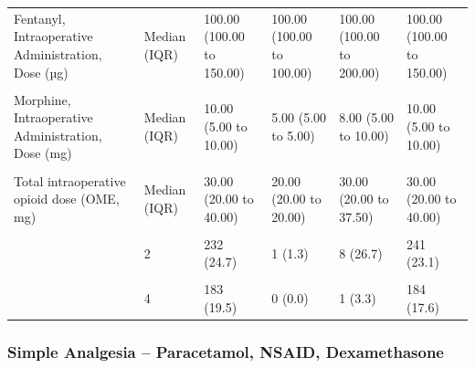 \documentclass[
  letterpaper,
  DIV=11,
  numbers=noendperiod]{scrreprt}
\begin{document}
\begin{table}
{\begin{tabular*}{\linewidth}{@{\extracolsep{\fill}}llllll}
{Fentanyl, Intraoperative Administration, Dose (µg)} & {Median (IQR)} & {100.00 (100.00 to 150.00)} & {100.00 (100.00 to 100.00)} & {100.00 (100.00 to 200.00)} & {100.00 (100.00 to 150.00)} \\ 
{\cellcolor[HTML]{F2F2F2}{Morphine}} & {\cellcolor[HTML]{F2F2F2}{N (\%)}} & {\cellcolor[HTML]{F2F2F2}{551 (44.2)}} & {\cellcolor[HTML]{F2F2F2}{2 (1.8)}} & {\cellcolor[HTML]{F2F2F2}{12 (30.8)}} & {\cellcolor[HTML]{F2F2F2}{565 (40.4)}} \\ 
{Morphine, Intraoperative Administration, Dose (mg)} & {Median (IQR)} & {10.00 (5.00 to 10.00)} & {5.00 (5.00 to 5.00)} & {8.00 (5.00 to 10.00)} & {10.00 (5.00 to 10.00)} \\ 
{\cellcolor[HTML]{F2F2F2}{Intra-operative opioids given}} & {\cellcolor[HTML]{F2F2F2}{N (\%)}} & {\cellcolor[HTML]{F2F2F2}{1139 (91.3)}} & {\cellcolor[HTML]{F2F2F2}{72 (64.9)}} & {\cellcolor[HTML]{F2F2F2}{39 (100.0)}} & {\cellcolor[HTML]{F2F2F2}{1250 (89.5)}} \\ 
{Total intraoperative opioid dose  (OME, mg)} & {Median (IQR)} & {30.00 (20.00 to 40.00)} & {20.00 (20.00 to 20.00)} & {30.00 (20.00 to 37.50)} & {30.00 (20.00 to 40.00)} \\ 
{\cellcolor[HTML]{F2F2F2}{Treatment group}} & {\cellcolor[HTML]{F2F2F2}{1}} & {\cellcolor[HTML]{F2F2F2}{76 (8.1)}} & {\cellcolor[HTML]{F2F2F2}{27 (36.0)}} & {\cellcolor[HTML]{F2F2F2}{0 (0.0)}} & {\cellcolor[HTML]{F2F2F2}{103 (9.9)}} \\ 
 & 2 & {232 (24.7)} & 1 (1.3) & 8 (26.7) & 241 (23.1) \\ 
{\cellcolor[HTML]{F2F2F2}{}} & {\cellcolor[HTML]{F2F2F2}{3}} & {\cellcolor[HTML]{F2F2F2}{448 (47.7)}} & {\cellcolor[HTML]{F2F2F2}{47 (62.7)}} & {\cellcolor[HTML]{F2F2F2}{21 (70.0)}} & {\cellcolor[HTML]{F2F2F2}{516 (49.4)}} \\ 
 & 4 & {183 (19.5)} & 0 (0.0) & 1 (3.3) & 184 (17.6) \\ 
\bottomrule
\end{tabular*}

}

\end{table}%

\subsubsection{Simple Analgesia -- Paracetamol, NSAID,
Dexamethasone}\label{simple-analgesia-paracetamol-nsaid-dexamethasone}
\end{document}
